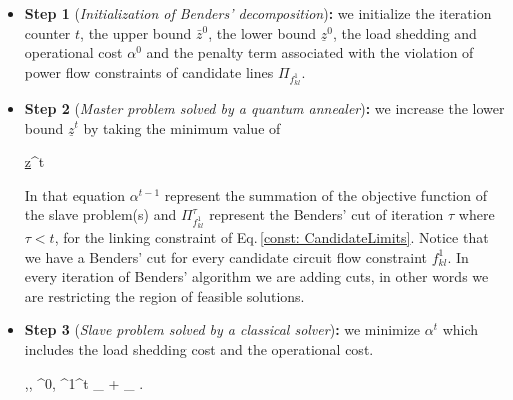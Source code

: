 \begin{itemize}
    \item \textbf{Step 1} (\textit{Initialization of Benders’ decomposition})\textbf{:} we initialize the iteration counter $t$, the upper bound $\bar{z}^{0}$, the lower bound $\underline{z}^{0}$, the load shedding and operational cost $\alpha^{0}$ and the penalty term associated with the violation of power flow constraints of candidate lines $\Pi_{f_{kl}^{1}}$.
    \item \textbf{Step 2} (\textit{Master problem solved by a quantum annealer})\textbf{:} we increase the lower bound $\underline{z}^{t}$ by taking the minimum value of 
        \begin{mini!}[2]
	   {}{\underline{z}^{t}}{}{}{}
        \end{mini!}
    In that equation $\alpha^{t-1}$ represent the summation of the objective function of the slave problem(s) and $\Pi_{f_{kl}^{1}}^{\tau}$ represent the Benders' cut of iteration $\tau$ where $\tau < t$, for the linking constraint of Eq.\,\eqref{const: CandidateLimits}. Notice that we have a Benders' cut for every candidate circuit flow constraint $f_{kl}^{1}$. In every iteration of Benders' algorithm we are adding cuts, in other words we are restricting the region of feasible solutions.
    \item \textbf{Step 3} (\textit{Slave problem solved by a classical solver})\textbf{:} we minimize $\alpha^{t}$ which includes the load shedding cost and the operational cost.
    \begin{mini!}[2]
	{,, ^{0}, ^{1}}{\alpha^{t} \equiv {}_{} + _{}}{}{}{}
    .

\end{mini!}
\end{itemize}
